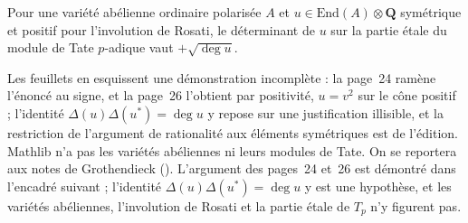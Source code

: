 \begin{encadre}
\begin{theoreme*}\nonverifie
Pour une variété abélienne ordinaire polarisée $A$ et $u \in \mathrm{End}(A) \otimes \mathbf Q$ symétrique et positif pour l'involution de Rosati, le déterminant de $u$ sur la partie étale du module de Tate $p$-adique vaut $+\sqrt{\deg u}$.
\end{theoreme*}
\end{encadre}
{\small Les feuillets en esquissent une démonstration incomplète : la page~24 ramène l'énoncé au signe, et la page~26 l'obtient par positivité, $u = v^2$ sur le cône positif ; l'identité $\Delta(u)\Delta(u^*) = \deg u$ y repose sur une justification illisible, et la restriction de l'argument de rationalité aux éléments symétriques est de l'édition. Mathlib n'a pas les variétés abéliennes ni leurs modules de Tate. On se reportera aux notes de Grothendieck (). L'argument des pages~24 et~26 est démontré dans l'encadré suivant ; l'identité $\Delta(u)\Delta(u^*) = \deg u$ y est une hypothèse, et les variétés abéliennes, l'involution de Rosati et la partie étale de $T_p$ n'y figurent pas.\par}

